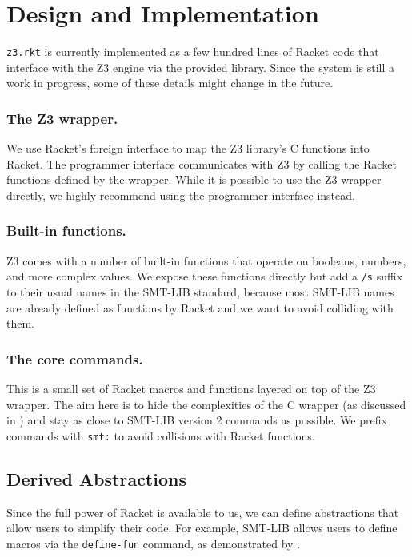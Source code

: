 \section{Design and Implementation}
\label{sec:design-impl}

\texttt{z3.rkt} is currently implemented as a few hundred lines of Racket code
that interface with the Z3 engine via the provided library. Since the system is
still a work in progress, some of these details might change in the future.

\subsubsection{The Z3 wrapper.} We use Racket's foreign interface \cite{racket/foreign}
to map the Z3 library's C functions into Racket. The programmer interface
communicates with Z3 by calling the Racket functions defined by the
wrapper. While it is possible to use the Z3 wrapper directly, we highly
recommend using the programmer interface instead.

\subsubsection{Built-in functions.} Z3 comes with a number of built-in functions that
operate on booleans, numbers, and more complex values. We expose these
functions directly but add a \texttt{/s} suffix to their usual names in the
SMT-LIB standard, because most SMT-LIB names are already defined as functions
by Racket and we want to avoid colliding with them.

\subsubsection{The core commands.} This is a small set of Racket macros and
functions layered on top of the Z3 wrapper. The aim here is to hide the
complexities of the C wrapper (as discussed in ) and
stay as close to SMT-LIB version 2 commands \cite{smtlib2:10} as possible. We
prefix commands with \texttt{smt:} to avoid collisions with Racket functions.

\subsection{Derived Abstractions}
\label{sec:derived}

Since the full power of Racket is available to us, we can define abstractions
that allow users to simplify their code. For example, SMT-LIB allows users to
define macros via the \texttt{define-fun} command, as demonstrated by
.

